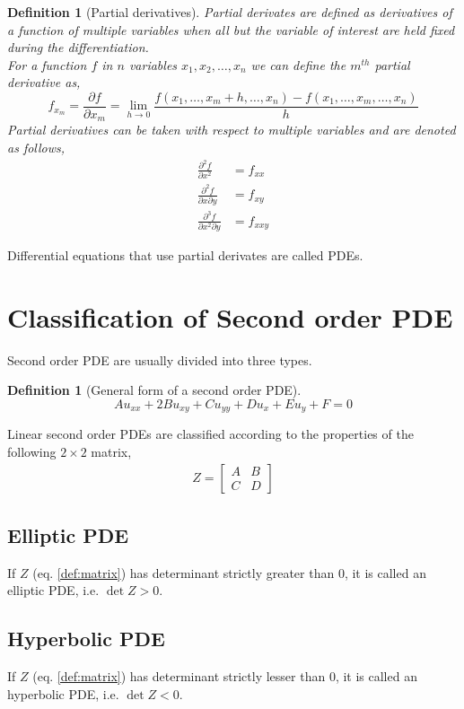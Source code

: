 \documentclass[oneside,11pt,pdftex,final]{book}%
\numberwithin{equation}{section}
\newtheorem{definition}[theorem]{Definition}
\numberwithin{section}{chapter}
\numberwithin{equation}{chapter}
\begin{document}
\begin{definition}[Partial derivatives]
	Partial derivates are defined as derivatives of a function of multiple variables when all but the variable of interest are held fixed during the differentiation.\\
	For a function $ f $ in $ n $ variables $ x_1,x_2,\dots, x_n $ we can define the $ m^{th} $ partial derivative as,
	\[ f_{x_m}=\frac{\partial f}{\partial x_m} = \lim_{h \rightarrow 0}\frac{f(x_1,\dots, x_m+h,\dots,x_n)-f(x_1,\dots,x_m, \dots,x_n)}{h}\]
	Partial derivatives can be taken with respect to multiple variables and are denoted as follows,
	\begin{align*}
		\frac{\partial^2 f}{\partial x^2}&=f_{xx}\\
		\frac{\partial^2 f}{\partial x \partial y}&=f_{xy}\\
		\frac{\partial^3 f}{\partial x^2 \partial y}&=f_{xxy}
	\end{align*}
\end{definition}
Differential equations that use partial derivates are called PDEs.


\section{Classification of Second order PDE}
Second order PDE are usually divided into three types.
\begin{definition}[General form of a second order PDE]
	\[ A u_{xx}+2B u_{xy}+C u_{yy}+Du_x+E u_y +F=0 \]
\end{definition}
Linear second order PDEs are classified according to the properties of the following $ 2\times 2 $ matrix,
\begin{align}\label{def:matrix}
	Z=\begin{bmatrix}
		A & B\\
		C & D
	\end{bmatrix}
\end{align}

\subsection{Elliptic PDE}
If $ Z $ (eq. \ref{def:matrix}) has determinant strictly greater than $ 0 $, it is called an elliptic PDE, i.e. $ \det Z > 0 $.

\subsection{Hyperbolic PDE}
If $ Z $ (eq. \ref{def:matrix}) has determinant strictly lesser than $ 0 $, it is called an hyperbolic PDE, i.e. $ \det Z < 0 $.
\end{document}

